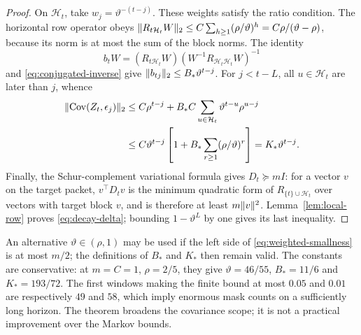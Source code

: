\begin{proof}
On $\mathcal H_t$, take $w_j=\vartheta^{-(t-j)}$. These weights satisfy
the ratio condition. The horizontal row operator obeys
$\lVert R_{t\mathcal H_t}W\rVert_2
 \le C\sum_{h\ge1}(\rho/\vartheta)^h
 =C\rho/(\vartheta-\rho)$, because its norm is at most the sum of
the block norms. The identity
\[
 b_tW=(R_{t\mathcal H_t}W)
                (W^{-1}R_{\mathcal H_t\mathcal H_t}W)^{-1}
\]
and \eqref{eq:conjugated-inverse} give
$\lVert b_{tj}\rVert_2\le B_*\vartheta^{t-j}$.
For $j<t-L$, all $u\in\mathcal H_t$ are later than $j$, whence
\begin{align*}
 \lVert\operatorname{Cov}(Z_t,\epsilon_j)\rVert_2
 &\le C\rho^{t-j}+B_*C\sum_{u\in\mathcal H_t}
                         \vartheta^{t-u}\rho^{u-j}\\
 &\le C\vartheta^{t-j}
             \left[1+B_*\sum_{r\ge1}(\rho/\vartheta)^r\right]
 =K_*\vartheta^{t-j}.
\end{align*}
Finally, the Schur-complement variational formula gives $D_t\succeq mI$:
for a vector $v$ on the target packet, $v^\top D_tv$ is the minimum
quadratic form of $R_{\{t\}\cup\mathcal H_t}$ over vectors with target
block $v$, and is therefore at least $m\lVert v\rVert^2$.
Lemma~\ref{lem:local-row} proves \eqref{eq:decay-delta}; bounding
$1-\vartheta^L$ by one gives its last inequality.
\end{proof}

An alternative $\vartheta\in(\rho,1)$ may be used if the left side of
\eqref{eq:weighted-smallness} is at most $m/2$; the definitions of $B_*$
and $K_*$ then remain valid. The constants are conservative: at
$m=C=1$, $\rho=2/5$, they give $\vartheta=46/55$, $B_*=11/6$ and
$K_*=193/72$. The first windows making the finite bound at most $0.05$
and $0.01$ are respectively $49$ and $58$, which imply enormous mask
counts on a sufficiently long horizon. The theorem broadens the covariance
scope; it is not a practical improvement over the Markov bounds.

